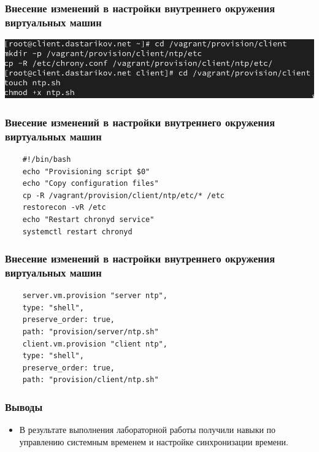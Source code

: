 \begin{frame}
\frametitle{Внесение изменений в настройки внутреннего окружения виртуальных машин}
    \centering
    \includegraphics[width=\textwidth]{../images/image18.png}
\end{frame}

\begin{frame}[fragile]
\frametitle{Внесение изменений в настройки внутреннего окружения виртуальных машин}
  \begin{verbatim}
    #!/bin/bash
    echo "Provisioning script $0"
    echo "Copy configuration files"
    cp -R /vagrant/provision/client/ntp/etc/* /etc
    restorecon -vR /etc
    echo "Restart chronyd service"
    systemctl restart chronyd
  \end{verbatim}
\end{frame}

\begin{frame}[fragile]
\frametitle{Внесение изменений в настройки внутреннего окружения виртуальных машин}
  \begin{verbatim}
    server.vm.provision "server ntp",
    type: "shell",
    preserve_order: true,
    path: "provision/server/ntp.sh"
    client.vm.provision "client ntp",
    type: "shell",
    preserve_order: true,
    path: "provision/client/ntp.sh"
  \end{verbatim}
\end{frame}

\begin{frame}
\frametitle{Выводы}
\begin{itemize}
    \item В результате выполнения лабораторной работы получили навыки по управлению системным временем и настройке синхронизации времени.
\end{itemize}
\end{frame}

